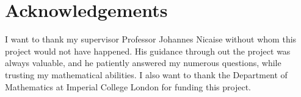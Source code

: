 \documentclass[12pt]{article}
\begin{document}






\section*{Acknowledgements}
I want to thank my supervisor Professor Johannes Nicaise without whom this
project would not have happened. His guidance through out the project was
always valuable, and he patiently answered my numerous questions, while
trusting my mathematical abilities. I also want to thank the Department of
Mathematics at Imperial College London for funding this project.



\end{document}
